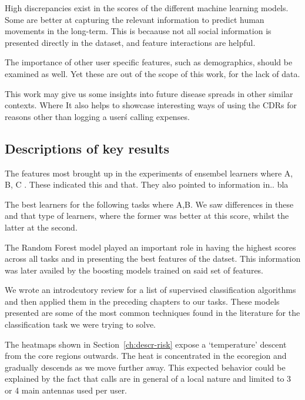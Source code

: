 High discrepancies exist in the scores of the different machine learning models.
Some are better at capturing the relevant information to predict human movements in the long-term.
This is becaause not all social information is presented directly in the dataset, and feature interactions are helpful.


The importance of other user specific features, such as demographics, should be examined as well.
Yet these are out of the scope of this work, for the lack of data.


This work may give us some insights into future disease spreads in other similar contexts.
Where
It also helps to showcase interesting ways of using the CDRs for reasons other than logging a user\'s calling expenses.


\subsection{Descriptions of key results}



The features most brought up in the experiments of ensembel learners where A, B, C .
These indicated this and that.
They also pointed to information in.. bla


The best learners for the following tasks where A,B.
We saw differences in these and that type of learners, where the former was better at this score, whilst the latter at the second.

The Random Forest model played an important role in having the highest scores across all tasks and in presenting the best features of the datset.
This information was later availed by the boosting models trained on said set of features.


We wrote an introdcutory review for a list of supervised classification algorithms and then applied them in the preceding chapters to our tasks.
These models presented are some of the most common techniques found in the literature for the classification task we were trying to solve.



The heatmaps shown in Section~\cref{ch:descr-risk} expose a `temperature' descent from the core regions outwards.
The heat is concentrated in the ecoregion and gradually descends as we move further away.
 This expected behavior could be explained by the fact that calls are in general of a local nature and limited to 3 or 4 main antennas used per user.

